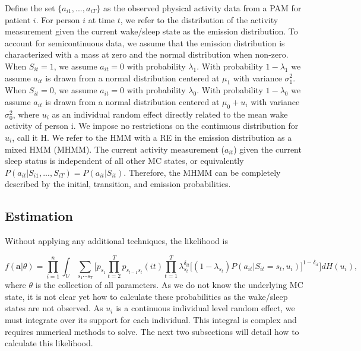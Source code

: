 \documentclass[num-refs]{wiley-article}
\begin{document}
Define the set $\{a_{i1}, ..., a_{iT}\}$ as the observed physical activity data from a PAM for patient $i$. For person $i$ at time $t$, we refer to the distribution of the activity measurement given the current wake/sleep state as the emission distribution. To account for semicontinuous data, we assume that the emission distribution is characterized with a mass at zero and the normal distribution when non-zero. When $S_{it}=1$, we assume $a_{it} = 0$ with probability $\lambda_1$. With probability $1-\lambda_1$ we assume $a_{it}$ is drawn from a normal distribution centered at $\mu_1$ with variance $\sigma_1^2$. When $S_{it}=0$, we assume $a_{it} = 0$ with probability $\lambda_0$. With probability $1 - \lambda_0$ we assume $a_{it}$ is drawn from a normal distribution centered at $\mu_0+u_i$ with variance $\sigma_0^2$, where $u_i$ as an individual random effect directly related to the mean wake activity of person i. We impose no restrictions on the continuous distribution for $u_i$, call it H. We refer to the HMM with a RE in the emission distribution as a mixed HMM (MHMM). The current activity measurement ($a_{it}$) given the current sleep status is independent of all other MC states, or equivalently $P(a_{it}|S_{i1}, ..., S_{iT}) = P(a_{it}|S_{it})$. Therefore, the MHMM can be completely described by the initial, transition, and emission probabilities.
 
\subsection{Estimation}

Without applying any additional techniques, the likelihood is 

\begin{equation*}
f(\textbf{a}|\theta) = \prod_{i=1}^n \int_U \sum_{{s_1}\cdots{s_T}} \biggr[ 
    p_{s_1} \prod_{t=2}^T p_{s_{t-1}s_t}(it) \prod_{t=1}^T \lambda_{s_t}^{\delta_{it}} \big[(1-\lambda_{s_t})P(a_{it}|S_{it}=s_t,u_i)\big]^{1-\delta_{it}}\biggr] dH(u_i),
\end{equation*}
where $\theta$ is the collection of all parameters. As we do not know the underlying MC state, it is not clear yet how to calculate these probabilities as the wake/sleep states are not observed. As $u_i$ is a continuous individual level random effect, we must integrate over its support for each individual. This integral is complex and requires numerical methods to solve. The next two subsections will detail how to calculate this likelihood. 
\end{document}
